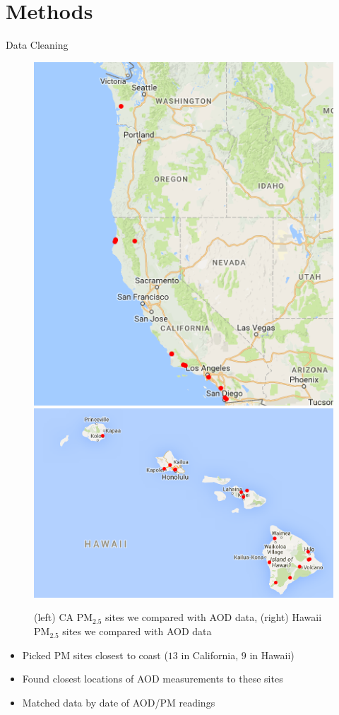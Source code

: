 \documentclass[notheorems,envcountsect,allowframebreaks,xcolor=svgnames,8pt]{beamer}
\begin{document}
\section{Methods}
\begin{frame}{Data Cleaning}
\begin{figure}[H]
\centering
\includegraphics[scale=0.25]{figs/pm13.png} 
\hspace{1mm}
\includegraphics[scale=0.3]{figs/mappmsiteshawaii.jpg}
\caption{(left) CA PM$_{2.5}$ sites we compared with AOD data, (right) Hawaii PM$_{2.5}$ sites we compared with AOD data}
\end{figure}

\begin{itemize}

\item Picked PM sites closest to coast ($13$ in California, $9$ in Hawaii)
\item Found closest locations of AOD measurements to these sites
\item Matched data by date of AOD/PM readings

\end{itemize}
\end{frame}
\end{document}
